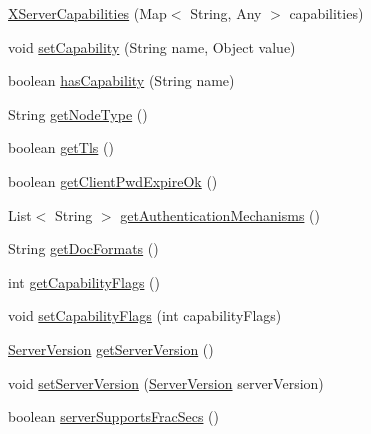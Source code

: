 \begin{DoxyCompactItemize}
\item 
\mbox{\hyperlink{classcom_1_1mysql_1_1cj_1_1protocol_1_1x_1_1_x_server_capabilities_a216dd3fc3abb3f5743b8430d931f9997}{X\+Server\+Capabilities}} (Map$<$ String, Any $>$ capabilities)
\item 
void \mbox{\hyperlink{classcom_1_1mysql_1_1cj_1_1protocol_1_1x_1_1_x_server_capabilities_a5a034ecd129c254b28a0364066861984}{set\+Capability}} (String name, Object value)
\item 
boolean \mbox{\hyperlink{classcom_1_1mysql_1_1cj_1_1protocol_1_1x_1_1_x_server_capabilities_ab39bc40a55b01f50822f14dc01aa08c5}{has\+Capability}} (String name)
\item 
String \mbox{\hyperlink{classcom_1_1mysql_1_1cj_1_1protocol_1_1x_1_1_x_server_capabilities_ae1c1c786b3d1c20e417974f2e12c4ed1}{get\+Node\+Type}} ()
\item 
boolean \mbox{\hyperlink{classcom_1_1mysql_1_1cj_1_1protocol_1_1x_1_1_x_server_capabilities_a1b4fa6872716162df174d15c5ec55d02}{get\+Tls}} ()
\item 
boolean \mbox{\hyperlink{classcom_1_1mysql_1_1cj_1_1protocol_1_1x_1_1_x_server_capabilities_a05a801548ecd715f86c351bd95da3c46}{get\+Client\+Pwd\+Expire\+Ok}} ()
\item 
List$<$ String $>$ \mbox{\hyperlink{classcom_1_1mysql_1_1cj_1_1protocol_1_1x_1_1_x_server_capabilities_a589a3d0a986d970501e2fff238cc2627}{get\+Authentication\+Mechanisms}} ()
\item 
String \mbox{\hyperlink{classcom_1_1mysql_1_1cj_1_1protocol_1_1x_1_1_x_server_capabilities_a0601ca883e613d700da8c4ab0c8e7180}{get\+Doc\+Formats}} ()
\item 
int \mbox{\hyperlink{classcom_1_1mysql_1_1cj_1_1protocol_1_1x_1_1_x_server_capabilities_a93c9f2ed36328b3ba55670f27d16d4f7}{get\+Capability\+Flags}} ()
\item 
void \mbox{\hyperlink{classcom_1_1mysql_1_1cj_1_1protocol_1_1x_1_1_x_server_capabilities_af05db5189b56c0a947fe82332ba6e328}{set\+Capability\+Flags}} (int capability\+Flags)
\item 
\mbox{\hyperlink{classcom_1_1mysql_1_1cj_1_1_server_version}{Server\+Version}} \mbox{\hyperlink{classcom_1_1mysql_1_1cj_1_1protocol_1_1x_1_1_x_server_capabilities_a05220b3f1dcfa896701c99b8f3d400c9}{get\+Server\+Version}} ()
\item 
void \mbox{\hyperlink{classcom_1_1mysql_1_1cj_1_1protocol_1_1x_1_1_x_server_capabilities_a352b240088439d6dff829d1f0a879d96}{set\+Server\+Version}} (\mbox{\hyperlink{classcom_1_1mysql_1_1cj_1_1_server_version}{Server\+Version}} server\+Version)
\item 
boolean \mbox{\hyperlink{classcom_1_1mysql_1_1cj_1_1protocol_1_1x_1_1_x_server_capabilities_a4b4c77a7eb2c156a57797a2b810be4e7}{server\+Supports\+Frac\+Secs}} ()
\end{DoxyCompactItemize}


